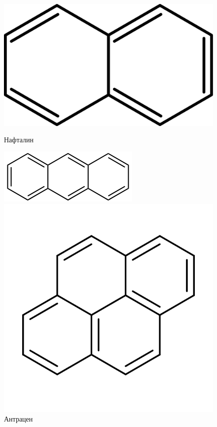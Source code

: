 \begin{lecture}
\begin{lecSection}
	\begin{figure}[H]
		\begin{minipage}[h]{0.26\linewidth}
			\centering\includegraphics[width=\linewidth]{lecture_03/naftalin}
			\caption{Нафталин}
		\end{minipage}
		\hfill
		\begin{minipage}[h]{0.30\linewidth}
			\centering\includegraphics[width=\linewidth]{lecture_03/antracen}
			\caption{Антрацен}
		\end{minipage}
		\hfill
		\begin{minipage}[h]{0.28\linewidth}
			\centering\includegraphics[width=\linewidth]{lecture_03/piren}

\end{minipage}
\end{figure}
\end{lecSection}
\end{lecture}
